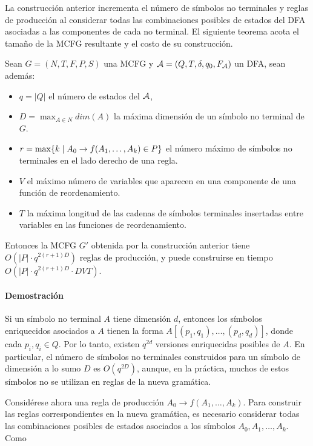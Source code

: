 La construcción anterior incrementa el número de símbolos no terminales y reglas de producción al considerar todas las combinaciones posibles de estados del DFA asociadas a las componentes de cada no terminal. El siguiente teorema acota el tamaño de la MCFG resultante y el costo de su construcción.

\begin{theorem}
    Sean $G = (N, T, F, P, S)$ una MCFG y $\mathcal{A} = (Q, T, \delta, q_0, F_{\mathcal{A}})$ un DFA, sean además:
    \begin{itemize}
        \item $q = |Q|$ el número de estados del $\mathcal{A}$,
        \item $D = \max_{A \in N} dim(A)$ la máxima dimensión de un símbolo no terminal de $G$.
        \item $r = \max\{k \;|\; A_0 \to f(A_1, \ldots, A_k) \in P\}$ el número máximo de símbolos no terminales en el lado derecho de una regla.
        \item $V$ el máximo número de variables que aparecen en una componente de una función de reordenamiento.
        \item $T$ la máxima longitud de las cadenas de símbolos terminales insertadas entre variables en las funciones de reordenamiento.
    \end{itemize}

    Entonces la MCFG $G'$ obtenida por la construcción anterior tiene $O(|P| \cdot q^{2(r+1)D})$ reglas de producción, y puede construirse en tiempo $O(|P| \cdot q^{2(r+1)D} \cdot DVT)$.
\end{theorem}

\paragraph{Demostración}
Si un símbolo no terminal $A$ tiene dimensión $d$, entonces los símbolos enriquecidos asociados a $A$ tienen la forma $A[(p_1, q_1), \ldots, (p_d, q_d)]$, donde cada $p_i, q_i \in Q$. Por lo tanto, existen $q^{2d}$ versiones enriquecidas posibles de $A$. En particular, el número de símbolos no terminales construidos para un símbolo de dimensión a lo sumo $D$ es $O(q^{2D})$, aunque, en la práctica, muchos de estos símbolos no se utilizan en reglas de la nueva gramática.

Considérese ahora una regla de producción $A_0 \to f(A_1, \ldots, A_k)$. Para construir las reglas correspondientes en la nueva gramática, es necesario considerar todas las combinaciones posibles de estados asociados a los símbolos $A_0, A_1, \ldots, A_k$. Como

